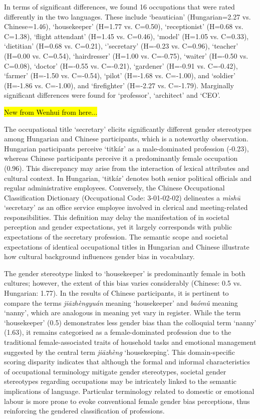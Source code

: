\documentclass[11pt]{article}
\newcommand{\zh}[1]{\simplifiedchinesefont{#1}\rmfamily}
\begin{document}
In terms of significant differences, we found 16 occupations that were rated differently in the two languages. These include `beautician' (Hungarian=2.27 vs. Chinese=1.46), `housekeeper' (H=1.77 vs. C=0.50), `receptionist' (H=0.68 vs. C=1.38), `flight attendant' (H=1.45 vs. C=0.46), `model' (H=1.05 vs. C=0.33), `dietitian' (H=0.68 vs. C=0.21), `'secretary' (H=-0.23 vs. C=0.96), `teacher' (H=0.00 vs. C=0.54), `hairdresser' (H=1.00 vs. C=-0.75), `waiter' (H=-0.50 vs. C=0.08), `doctor' (H=-0.55 vs. C=-0.21), `gardener' (H=-0.91 vs. C=-0.42), `farmer' (H=-1.50 vs. C=-0.54),  `pilot' (H=-1.68 vs. C=-1.00), and `soldier' (H=-1.86 vs. C=-1.00), and `firefighter' (H=-2.27 vs. C=-1.79). Marginally significant differences were found for `professor', `architect' and `CEO'. 

\hl{New from Wenhui from here...}

The occupational title `secretary' elicits significantly different gender stereotypes among Hungarian and Chinese participants, which is a noteworthy observation. Hungarian participants perceive `titkár' as a male-dominated profession (-0.23), whereas Chinese participants perceive it a predominantly female occupation (0.96). This discrepancy may arise from the interaction of lexical attributes and cultural context. In Hungarian, `titkár' denotes both senior political officials and regular administrative employees. Conversely, the Chinese Occupational Classification Dictionary (Occupational Code: 3-01-02-02) delineates a \zh{秘书} \textit{mìshū} `secretary' as an office service employee involved in clerical and meeting-related responsibilities. This definition may delay the manifestation of in societal perception and gender expectations, yet it largely corresponds with public expectations of the secretary profession. The semantic scope and societal expectations of identical occupational titles in Hungarian and Chinese illustrate how cultural background influences gender bias in vocabulary.

The gender stereotype linked to `housekeeper' is predominantly female in both cultures; however, the extent of this bias varies considerably (Chinese: 0.5 vs. Hungarian: 1.77). In the results of Chinese participants, it is pertinent to compare the terms \zh{家政员} \textit{jiāzhèngyuán} meaning `housekeeper' and \zh{保姆} \textit{baómǔ} meaning `nanny', which are analogous in meaning yet vary in register. While the term `housekeeper' (0.5) demonstrates less gender bias than the colloquial term `nanny' (1.63), it remains categorised as a female-dominated profession due to the traditional female-associated traits of household tasks and emotional management suggested by the central term \zh{家政} \textit{jiāzhèng} `housekeeping'. This domain-specific scoring disparity indicates that although the formal and informal characteristics of occupational terminology mitigate gender stereotypes, societal gender stereotypes regarding occupations may be intricately linked to the semantic implications of language. Particular terminology related to domestic or emotional labour is more prone to evoke conventional female gender bias perceptions, thus reinforcing the gendered classification of professions.
\end{document}
